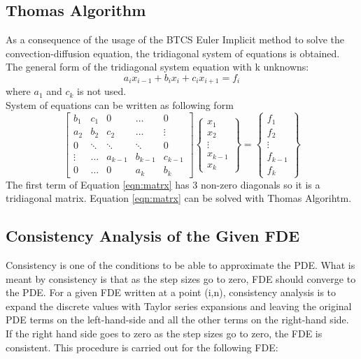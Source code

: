 \documentclass[letterpaper,12pt]{article}
\begin{document}
\subsection{Thomas Algorithm}
As a consequence of the usage of the BTCS Euler Implicit method to solve the convection-diffusion
equation, the tridiagonal system of equations is obtained. The general form of the tridiagonal system
equation with k unknowns:
\begin{equation}
	a_i x_{i-1}+b_i x_i+c_i x_{i+1}=f_i
\end{equation}
where $a_1$ and $c_k$ is not used.\\System of equations can be written as following form
\begin{equation}
	\begin{bmatrix}
		b_1 & c_1    & 0      &\dots    &0   \\
		a_2 & b_2    & c_2    &\dots    &\vdots\\
		0   & \ddots & \ddots & \ddots	& 0    \\
		\vdots& \dots&a_{k-1} & b_{k-1} & c_{k-1}\\
		0   & \dots  & 0      & a_k     & b_k 
		\end{bmatrix}
	\begin{Bmatrix}
		x_1\\
		x_2\\
		\vdots\\
		x_{k-1}\\
		x_k
		\end{Bmatrix}
	=
	\begin{Bmatrix}
		f_1\\
		f_2\\
		\vdots\\
		f_{k-1}\\
		f_k
	\end{Bmatrix}
	\label{eqn:matrx}
\end{equation}
The first term of Equation \ref{eqn:matrx} has 3 non-zero diagonals so
it is a tridiagonal matrix. Equation \ref{eqn:matrx} can be solved with Thomas
Algorihtm.

\subsection{Consistency Analysis of the Given FDE}
\label{sub:cons}
Consistency is one of the conditions to be able to approximate the PDE. What is meant by consistency is
that as the step sizes go to zero, FDE should converge to the PDE. For a given FDE written at a point
(i,n), consistency analysis is to expand the discrete values with Taylor series expansions and leaving
the original PDE terms on the left-hand-side and all the other terms on the right-hand side. If the right
hand side goes to zero as the step sizes go to zero, the FDE is consistent. This procedure is carried
out for the following FDE: 
\end{document}
